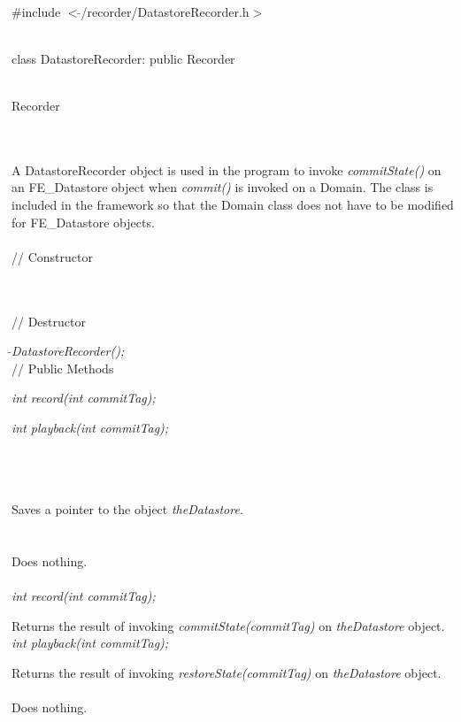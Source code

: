 
   \\
\#include $<\tilde{ }$/recorder/DatastoreRecorder.h$>$  


  \\
class DatastoreRecorder: public Recorder


 \\
Recorder 

\indent{} \\

  \\
\noindent A DatastoreRecorder object is used in the program to invoke
{\em commitState()} on an FE\_Datastore object when {\em commit()} is
invoked on a Domain. The class is included in the framework so that
the Domain class does not have to be modified for FE\_Datastore
objects. \\ 


 \\
// Constructor 

\\ \\ 
// Destructor 

{\em $\tilde{ }$DatastoreRecorder();}\\ 

// Public Methods  

{\em int record(int commitTag);}

{\em int playback(int commitTag);}

\\ 

  \\
\\ 
Saves a pointer to the object {\em theDatastore}. \\

 \\
\\ 
Does nothing. \\

  \\
{\em int record(int commitTag);}

Returns the result of invoking {\em commitState(commitTag)} on {\em
theDatastore} object. \\ 

{\em int playback(int commitTag);}

Returns the result of invoking {\em restoreState(commitTag)} on {\em
theDatastore} object. \\ 

\\ 
Does nothing.